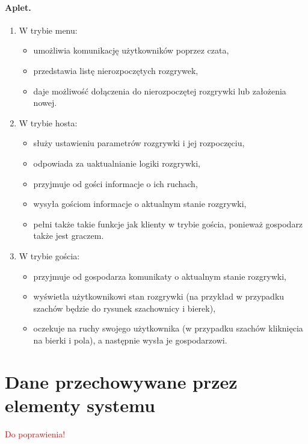 \documentclass[a4paper, 12pt]{article}
\begin{document}
\paragraph{Aplet.}
\begin{enumerate}
 \item W trybie menu:
    \begin{itemize}
      \item umożliwia komunikację użytkowników poprzez czata,
      \item przedstawia listę nierozpoczętych rozgrywek,
      \item daje możliwość dołączenia do nierozpoczętej rozgrywki lub założenia nowej.
    \end{itemize}

 \item W trybie hosta:
    \begin{itemize}
      \item służy ustawieniu parametrów rozgrywki i jej rozpoczęciu,
      \item odpowiada za uaktualnianie logiki rozgrywki,
      \item przyjmuje od gości informacje o ich ruchach,
      \item wysyła gościom informacje o aktualnym stanie rozgrywki,
      \item pełni także takie funkcje jak klienty w trybie gościa, ponieważ gospodarz także jest graczem.
    \end{itemize}

 \item W trybie gościa:
    \begin{itemize}
      \item przyjmuje od gospodarza komunikaty o aktualnym stanie rozgrywki,
      \item wyświetla użytkownikowi stan rozgrywki (na przykład w przypadku szachów będzie do rysunek szachownicy i bierek),
      \item oczekuje na ruchy swojego użytkownika (w przypadku szachów kliknięcia na bierki i pola), a następnie wysła je gospodarzowi.
    \end{itemize}
\end{enumerate}

\section{Dane przechowywane przez elementy systemu}
\begin{Large}
\textcolor{red}{Do poprawienia!}
\end{Large}
\end{document}
